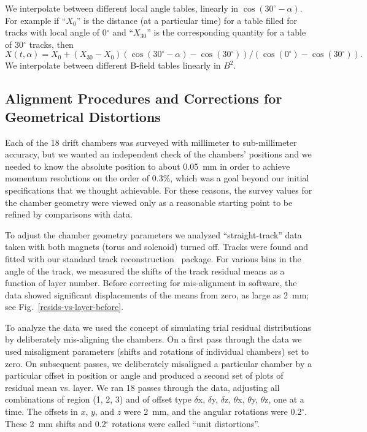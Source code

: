 We interpolate between different local angle tables, linearly in $\cos(30^\circ-\alpha)$.
For example if ``$X_0$'' is the distance (at a particular time) for a table filled for tracks with local
angle of 0$^\circ$ and ``$X_{30}$'' is the corresponding quantity for a table of 30$^\circ$ tracks, then
\begin{equation} 
\label{eq-extrap30}
X(t,\alpha) = X_0 + (X_{30}-X_0) (\cos(30^\circ-\alpha) - \cos(30^\circ)) / (\cos(0^\circ) - \cos(30^\circ)).
\end{equation}
We interpolate between different B-field tables linearly in $B^2$.

\subsection{Alignment Procedures and Corrections for Geometrical Distortions}
\label{align}

Each of the 18 drift chambers was surveyed with millimeter to sub-millimeter
accuracy, but we wanted an independent check of the chambers' positions and 
we needed to know the absolute position to about 0.05~mm in order to 
achieve momentum resolutions on the order of 0.3\%, which was a goal beyond
our initial specifications that we thought achievable.  For 
these reasons, the survey values for the chamber geometry were viewed only as 
a reasonable starting point to be refined by comparisons with data.

To adjust the chamber geometry parameters we analyzed
``straight-track'' data taken with both magnets (torus and solenoid) turned off.  
Tracks were found and fitted with our standard track reconstruction~\cite{recon-nim} package.
For various bins in the angle of the track, we measured the shifts of the
track residual means as a function of layer number. 
Before correcting for mis-alignment in software, the data showed significant 
displacements of the means from zero, as large as 2~mm; see Fig.~\ref{resids-vs-layer-before}.

To analyze the data we used the concept of simulating trial residual
distributions by deliberately mis-aligning the chambers.
On a first pass through
the data we used misaligment parameters (shifts and rotations of individual
chambers) set to zero.  On subsequent passes, we deliberately misaligned
a particular chamber by a particular offset in position or angle and 
produced a second set of plots of residual mean vs. layer.  We ran 18 passes
through the data, adjusting all combinations of region (1, 2, 3) and
of offset type $\delta$x, $\delta$y, $\delta$z, $\theta$x, 
$\theta$y, $\theta$z, one at
a time.  The offsets in $x$, $y$, and $z$ were 2~mm, and the angular rotations
were 0.2$^\circ$.  These 2~mm shifts and 0.2$^\circ$ rotations were
called ``unit distortions''.

